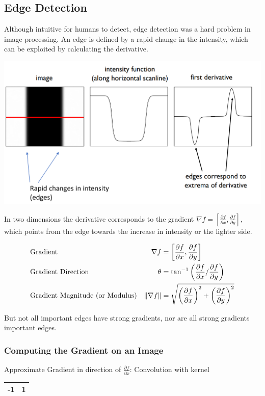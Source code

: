 \subsection{Edge Detection}
Although intuitive for humans to detect, edge detection was a hard problem in image processing. An edge is defined by a rapid change in the intensity,
which can be exploited by calculating the derivative.

\begin{center}
	\includegraphics[width=0.6\linewidth]{img/1D_edge_derivative}
\end{center}

\noindent
In two dimensions the derivative corresponds to the gradient $\nabla f = \left[\frac{\partial f}{\partial x},\frac{\partial f}{\partial y}\right]$,
which points from the edge towards the increase in intensity or the lighter side.

\begin{align}
	& \text{Gradient} & \nabla f &= \left[ \frac{\partial f}{\partial x}, \frac{\partial f}{\partial y} \right] \\
	& \text{Gradient Direction} & \theta &= \tan^{-1} \left( \frac{\partial f}{\partial x} / \frac{\partial f}{\partial y} \right) \\
	& \text{Gradient Magnitude (or Modulus)} & \lVert\nabla f\rVert &= \sqrt{\left(\frac{\partial f}{\partial x}\right)^2 + \left(\frac{\partial f}{\partial y} \right)^2 }
\end{align}

But not all important edges have strong gradients, nor are all strong gradients important edges.

\subsubsection{Computing the Gradient on an Image}
Approximate Gradient in direction of $ \frac{\partial f}{\partial x} $: Convolution with kernel \begin{tabular}{|c|c|}
	\hline
	-1 & 1\\
	\hline
\end{tabular}

